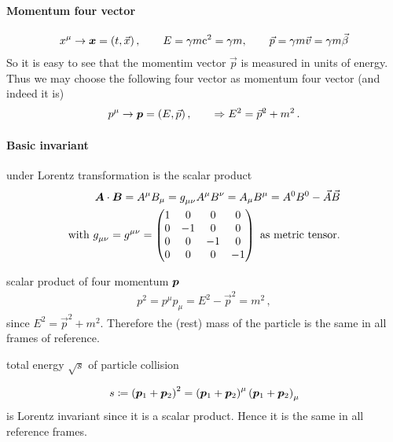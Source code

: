 \paragraph{Momentum four vector}
\begin{align}
    x^\mu \rightarrow {\bm{x}} = \left( t, \vec x\right), \qquad E = \gamma m \mathrm{c}^2 = \gamma m, \qquad \vec p = \gamma m \vec v = \gamma m \vec \beta
\end{align}
So it is easy to see that the momentim vector $\vec p$ is measured in units of energy. Thus we may choose the following four vector as momentum four vector (and indeed it is)
\begin{align}
    p^\mu \rightarrow {\bm{p}} = \left( E, \vec p \right), \qquad \Rightarrow E^2 = \vec p^2 +m^2\,.
\end{align}
\paragraph{Basic invariant} under Lorentz transformation is the scalar product
\begin{align}
    \fvec A \cdot \fvec B = A^\mu B_\mu = \tensor{g}{_\mu_\nu} A^\mu B^\nu = A_\mu B^\mu = A^0B^0 - \vec A \vec B\\
    \text{with } \tensor{g}{_\mu_\nu} = \tensor{g}{^\mu^\nu} = \mat{1 & 0 & 0 & 0 \\ 0 & -1 & 0 & 0 \\ 0 & 0 & -1 & 0 \\ 0 & 0 & 0 & -1} \text{ as metric tensor.} \nonumber
\end{align}
\begin{example}
    scalar product of four momentum ${\bm{p}}$
    \begin{align}
        p^2 = p^\mu p_\mu = E^2 - \vec p^2 = m^2\,,
    \end{align}
    since $E^2 = \vec p^2 +m^2$. Therefore the (rest) mass of the particle is the same in all frames of reference.
\end{example}
\begin{example}
    total energy $\sqrt s$ of particle collision
    \begin{center}
    \end{center}
    \begin{align}
        s \coloneqq \left( {\bm{p}}_1 + {\bm{p}}_2\right)^2 = \left( {\bm{p}}_1 + {\bm{p}}_2 \right)^\mu \left( {\bm{p}}_1 + {\bm{p}}_2 \right)_\mu 
    \end{align}
    is Lorentz invariant since it is a scalar product. Hence it is the same in all reference frames.
\end{example}
